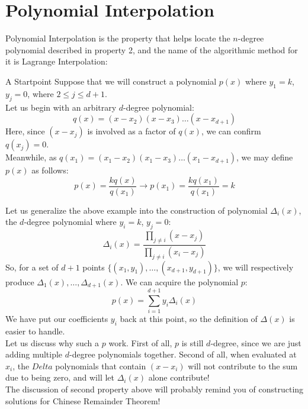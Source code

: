 \section{Polynomial Interpolation}
Polynomial Interpolation is the property that helps locate the $n$-degree polynomial described in property 2, and the name of the algorithmic method for it is Lagrange Interpolation:
\begin{ln-think}{A Startpoint}{}
    Suppose that we will construct a polynomial $p(x)$ where $y_1 = k$, $y_j = 0$, where $2 \leq j \leq d + 1$. \\
    Let us begin with an arbitrary $d$-degree polynomial:
    \[q(x) = (x - x_2)(x - x_3)\dots(x - x_{d + 1})\]
    Here, since $(x - x_j)$ is involved as a factor of $q(x)$, we can confirm $q(x_j) = 0$. \\
    Meanwhile, as $q(x_1) = (x_1 - x_2)(x_1 - x_3)\dots(x_1 - x_{d + 1})$, we may define $p(x)$ as follows:
    \[p(x) = \frac{k q(x)}{q(x_1)} \rightarrow p(x_1) = \frac{k q(x_1)}{q(x_1)} = k\]
\end{ln-think}
Let us generalize the above example into the construction of polynomial $\Delta_i (x)$, the $d$-degree polynomial where $y_i = k$, $y_j = 0$:
\[\Delta_i (x) = \frac{\prod_{j \neq i} (x - x_j)}{\prod_{j \neq i} (x_i - x_j)}\]
So, for a set of $d+1$ points $\{(x_1, y_1), \dots, (x_{d + 1}, y_{d + 1})\}$, we will respectively produce $\Delta_1(x), \dots, \Delta_{d + 1}(x)$. We can acquire the polynomial $p$:
\[p(x) = \sum_{i = 1}^{d + 1} y_i \Delta_i(x)\]
We have put our coefficients $y_i$ back at this point, so the definition of $\Delta(x)$ is easier to handle. \\
Let us discuss why such a $p$ work. First of all, $p$ is still $d$-degree, since we are just adding multiple $d$-degree polynomials together. Second of all, when evaluated at $x_i$, the $Delta$ polynomials that contain $(x - x_i)$ will not contribute to the sum due to being zero, and will let $\Delta_i(x)$ alone contribute! \\
The discussion of second property above will probably remind you of constructing solutions for Chinese Remainder Theorem!
